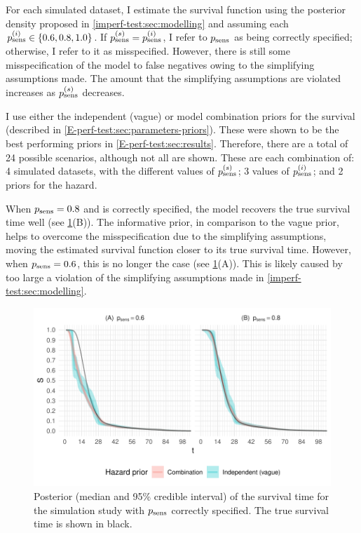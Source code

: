 \documentclass[thesis.tex]{subfiles}
\begin{document}
For each simulated dataset, I estimate the survival function using the posterior density proposed in \cref{imperf-test:sec:modelling} and assuming each $p_\text{sens}^{(i)} \in \{0.6, 0.8, 1.0\}$.
If $p_\text{sens}^{(s)} = p_\text{sens}^{(i)}$, I refer to $p_\text{sens}$ as being correctly specified; otherwise, I refer to it as misspecified.
However, there is still some misspecification of the model to false negatives owing to the simplifying assumptions made.
The amount that the simplifying assumptions are violated increases as $p_\text{sens}^{(s)}$ decreases.

I use either the independent (vague) or model combination priors for the survival (described in \cref{E-perf-test:sec:parameters-priors}).
These were shown to be the best performing priors in \cref{E-perf-test:sec:results}.
Therefore, there are a total of 24 possible scenarios, although not all are shown.
These are each combination of: 4 simulated datasets, with the different values of $p_\text{sens}^{(s)}$; 3 values of $p_\text{sens}^{(i)}$; and 2 priors for the hazard.

When $p_\text{sens} = 0.8$ and is correctly specified, the model recovers the true survival time well (see \cref{imperf-test:fig:constant-test-sensitivity}(B)).
The informative prior, in comparison to the vague prior, helps to overcome the misspecification due to the simplifying assumptions, moving the estimated survival function closer to its true survival time.
However, when $p_\text{sens} = 0.6$, this is no longer the case (see \cref{imperf-test:fig:constant-test-sensitivity}(A)).
This is likely caused by too large a violation of the simplifying assumptions made in \cref{imperf-test:sec:modelling}.
\begin{figure}
  \includegraphics[width=\textwidth]{cis-imperfect-testing/sim-constant-sensitivity}
  \caption[Simulation study results with constant test sensitivity]{%
    Posterior (median and 95\% credible interval) of the survival time for the simulation study with $p_\text{sens}$ correctly specified.
    The true survival time is shown in black.
  }
  \label{imperf-test:fig:constant-test-sensitivity}
\end{figure}
\end{document}

